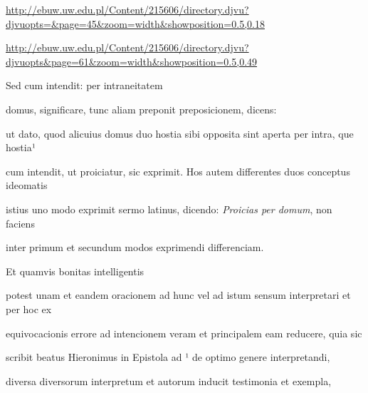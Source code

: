 
\newParkoszpage

{
\url{http://ebuw.uw.edu.pl/Content/215606/directory.djvu?djvuopts=&page=45&zoom=width&showposition=0.5,0.18}

\url{http://ebuw.uw.edu.pl/Content/215606/directory.djvu?djvuopts&page=61&zoom=width&showposition=0.5,0.49}
}
\fullpreviouslines


{
\color{blue}

Sed cum intendit: per intraneitatem

domus, significare, tunc aliam preponit preposicionem, dicens: 

}



\fulllines{}
ut dato, quod alicuius domus duo hostia sibi opposita sint aperta per intra, que hostia¹

cum intendit, ut proiciatur, sic exprimit. Hos autem differentes duos conceptus ideomatis

istius uno modo exprimit sermo latinus, dicendo: \textit{Proicias per domum}, non faciens

\splitlines{}

inter primum et secundum modos exprimendi differenciam.

\indentK Et quamvis bonitas intelligentis 

\fulllines{}

potest unam et eandem oracionem ad hunc vel ad istum sensum interpretari et per hoc ex

equivocacionis errore ad intencionem veram et principalem eam reducere, quia sic

scribit beatus Hieronimus in Epistola ad ¹ de optimo genere interpretandi,

diversa diversorum interpretum et autorum inducit testimonia et exempla,

